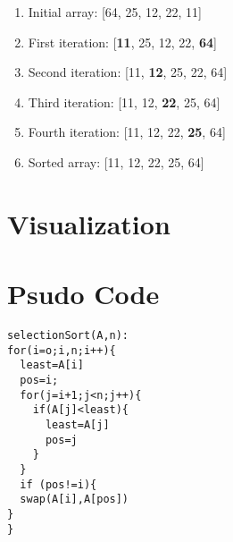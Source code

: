 \documentclass{article}
\begin{document}
\begin{enumerate}
  \item Initial array: [64, 25, 12, 22, 11]
  \item First iteration: [\textbf{11}, 25, 12, 22, \textbf{64}]
  \item Second iteration: [11, \textbf{12}, 25, 22, 64]
  \item Third iteration: [11, 12, \textbf{22}, 25, 64]
  \item Fourth iteration: [11, 12, 22, \textbf{25}, 64]
  \item Sorted array: [11, 12, 22, 25, 64]
\end{enumerate}
\section*{Visualization}
\newpage
\section*{Psudo Code}
\begin{verbatim}
selectionSort(A,n):
for(i=o;i,n;i++){
  least=A[i]
  pos=i;
  for(j=i+1;j<n;j++){
    if(A[j]<least){
      least=A[j]
      pos=j
    }
  }
  if (pos!=i){
  swap(A[i],A[pos])
}
}



\end{verbatim}
\end{document}
